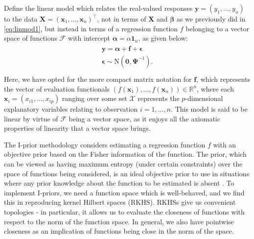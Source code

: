 Define the linear model which relates the real-valued responses $\mathbf y=(y_1,\dots,y_n)$ to the data $\mathbf X = (\mathbf x_1, \dots, \mathbf x_n)^\top$, not in terms of $\mathbf X$ and $\boldsymbol\beta$ as we previously did in \eqref{eq:linmod1}, but instead in terms of a regression function $f$ belonging to a vector space of functions $\mathcal{F}$ with intercept $\boldsymbol\alpha=\alpha\mathbf 1_n$, as given below:
\begin{align}\label{eq:linmod2}
	\begin{gathered}
		\mathbf y = \boldsymbol\alpha + \mathbf f + \boldsymbol\epsilon \\
		\boldsymbol\epsilon \sim \text{N}(\mathbf 0, \boldsymbol\Psi^{-1}).\\
	\end{gathered}
\end{align}
Here, we have opted for the more compact matrix notation for $\mathbf f$, which represents the vector of evaluation functionals $(f(\mathbf x_1), \dots, f(\mathbf x_n)) \in \mathbb{R}^n$, where each $\mathbf x_i = (x_{i1}, \dots, x_{ip})$ ranging over some set $\mathcal X$ represents the $p$-dimensional explanatory variables relating to observation $i=1,\dots, n$. This model is said to be linear by virtue of $\mathcal{F}$ being a vector space, as it enjoys all the axiomatic properties of linearity that a vector space brings.  

The I-prior methodology considers estimating a regression function $f$ with an objective prior based on the Fisher information of the function. The prior, which can be viewed as having maximum entropy (under certain constraints) over the space of functions being considered, is an ideal objective prior to use in situations where any prior knowledge about the function to be estimated is absent \citep{Jaynes1957, Jaynes1957a, jaynes2003}. To implement I-priors, we need a function space which is well-behaved, and we find this in reproducing kernel Hilbert spaces (RKHS). RKHSs give us convenient topologies - in particular, it allows us to evaluate the closeness of functions with respect to the norm of the function space. In general, we also have pointwise closeness as an implication of functions being close in the norm of the space. 

